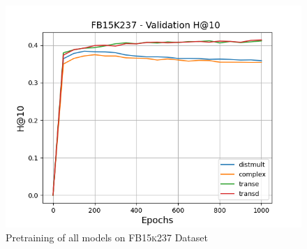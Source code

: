 \begin{figure}
    \begin{minipage}{.3\textwidth}
      \centering
      \includegraphics[width=0.9\linewidth]{figures/results/pretrain/fb15k237/pretrain_fb15k237_hit10s.png}
    \end{minipage}%
    \caption{Pretraining of all models on \textsc{FB15k237} Dataset}
    \label{fig:test}
\end{figure}

\pagebreak

